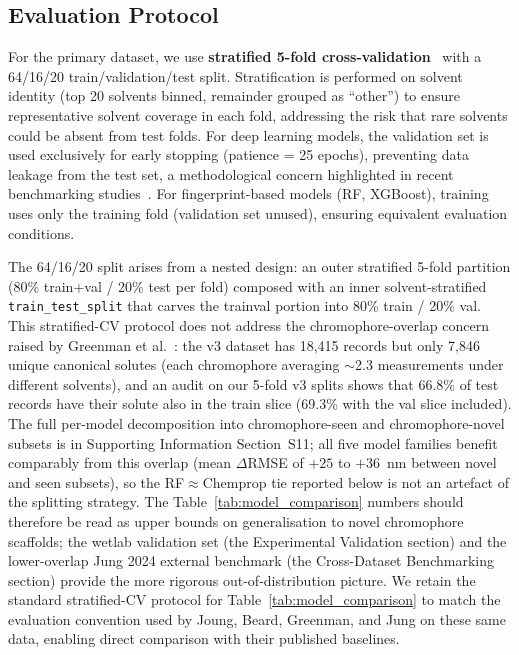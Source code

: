\documentclass[journal=jcisd8,manuscript=article]{achemso}
\newcommand{\added}[1]{{\color{addedblue}#1}}
\begin{document}
\subsection{Evaluation Protocol}
\label{sec:evaluation}

For the primary dataset, we use \textbf{stratified 5-fold cross-validation}~\cite{kohavi1995study} with a 64/16/20 train/validation/test split.
Stratification is performed on solvent identity (top 20 solvents binned, remainder grouped as ``other'') to ensure representative solvent coverage in each fold, addressing the risk that rare solvents could be absent from test folds.
For deep learning models, the validation set is used exclusively for early stopping (patience = 25 epochs), preventing data leakage from the test set, a methodological concern highlighted in recent benchmarking studies~\cite{panapitiya2022evaluation}.
For fingerprint-based models (RF, XGBoost), training uses only the training fold (validation set unused), ensuring equivalent evaluation conditions.

\added{The 64/16/20 split arises from a nested design: an outer stratified 5-fold partition (80\% train+val / 20\% test per fold) composed with an inner solvent-stratified \texttt{train\_test\_split} that carves the trainval portion into 80\% train / 20\% val. This stratified-CV protocol does not address the chromophore-overlap concern raised by Greenman et al.~\cite{greenman2022multifidelity}: the v3 dataset has 18{,}415 records but only 7{,}846 unique canonical solutes (each chromophore averaging $\sim$2.3 measurements under different solvents), and an audit on our 5-fold v3 splits shows that 66.8\% of test records have their solute also in the train slice (69.3\% with the val slice included). The full per-model decomposition into chromophore-seen and chromophore-novel subsets is in Supporting Information Section~S11; all five model families benefit comparably from this overlap (mean $\Delta$RMSE of $+25$ to $+36$~nm between novel and seen subsets), so the RF$\approx$Chemprop tie reported below is not an artefact of the splitting strategy. The Table~\ref{tab:model_comparison} numbers should therefore be read as upper bounds on generalisation to novel chromophore scaffolds; the wetlab validation set (the Experimental Validation section) and the lower-overlap Jung 2024 external benchmark (the Cross-Dataset Benchmarking section) provide the more rigorous out-of-distribution picture. We retain the standard stratified-CV protocol for Table~\ref{tab:model_comparison} to match the evaluation convention used by Joung, Beard, Greenman, and Jung on these same data, enabling direct comparison with their published baselines.}
\end{document}
